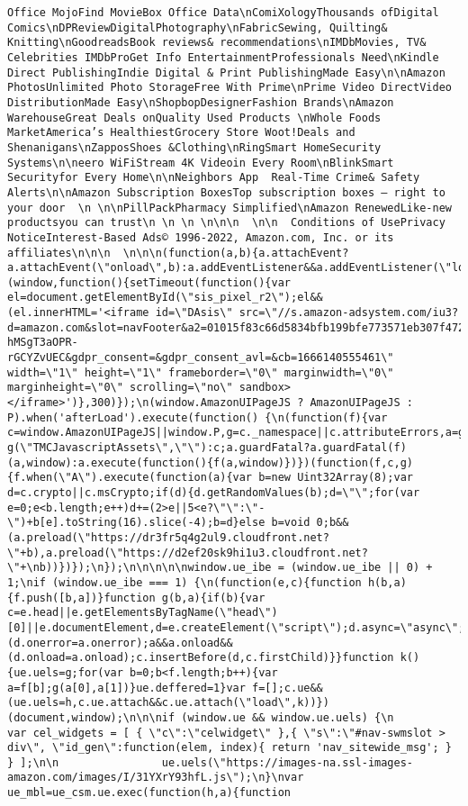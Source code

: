 \documentclass[
]{article}
\begin{document}
\begin{verbatim}
Office MojoFind MovieBox Office Data\nComiXologyThousands ofDigital Comics\nDPReviewDigitalPhotography\nFabricSewing, Quilting& Knitting\nGoodreadsBook reviews& recommendations\nIMDbMovies, TV& Celebrities IMDbProGet Info EntertainmentProfessionals Need\nKindle Direct PublishingIndie Digital & Print PublishingMade Easy\n\nAmazon PhotosUnlimited Photo StorageFree With Prime\nPrime Video DirectVideo DistributionMade Easy\nShopbopDesignerFashion Brands\nAmazon WarehouseGreat Deals onQuality Used Products \nWhole Foods MarketAmerica’s HealthiestGrocery Store Woot!Deals and Shenanigans\nZapposShoes &Clothing\nRingSmart HomeSecurity Systems\n\neero WiFiStream 4K Videoin Every Room\nBlinkSmart Securityfor Every Home\n\nNeighbors App  Real-Time Crime& Safety Alerts\n\nAmazon Subscription BoxesTop subscription boxes – right to your door  \n \n\nPillPackPharmacy Simplified\nAmazon RenewedLike-new productsyou can trust\n \n \n \n\n\n  \n\n  Conditions of UsePrivacy NoticeInterest-Based Ads© 1996-2022, Amazon.com, Inc. or its affiliates\n\n\n  \n\n\n(function(a,b){a.attachEvent?a.attachEvent(\"onload\",b):a.addEventListener&&a.addEventListener(\"load\",b,!1)})(window,function(){setTimeout(function(){var el=document.getElementById(\"sis_pixel_r2\");el&&(el.innerHTML='<iframe id=\"DAsis\" src=\"//s.amazon-adsystem.com/iu3?d=amazon.com&slot=navFooter&a2=01015f83c66d5834bfb199bfe773571eb307f47201e25af2e5a6c51e7460d476ba09&old_oo=0&ts=1666140555461&s=AabdAbdHLq_vxJUqwIAcT_D-hMSgT3aOPR-rGCYZvUEC&gdpr_consent=&gdpr_consent_avl=&cb=1666140555461\" width=\"1\" height=\"1\" frameborder=\"0\" marginwidth=\"0\" marginheight=\"0\" scrolling=\"no\" sandbox></iframe>')},300)});\n(window.AmazonUIPageJS ? AmazonUIPageJS : P).when('afterLoad').execute(function() {\n(function(f){var c=window.AmazonUIPageJS||window.P,g=c._namespace||c.attributeErrors,a=g?g(\"TMCJavascriptAssets\",\"\"):c;a.guardFatal?a.guardFatal(f)(a,window):a.execute(function(){f(a,window)})})(function(f,c,g){f.when(\"A\").execute(function(a){var b=new Uint32Array(8);var d=c.crypto||c.msCrypto;if(d){d.getRandomValues(b);d=\"\";for(var e=0;e<b.length;e++)d+=(2>e||5<e?\"\":\"-\")+b[e].toString(16).slice(-4);b=d}else b=void 0;b&&(a.preload(\"https://dr3fr5q4g2ul9.cloudfront.net?\"+b),a.preload(\"https://d2ef20sk9hi1u3.cloudfront.net?\"+\nb))})});\n});\n\n\n\n\nwindow.ue_ibe = (window.ue_ibe || 0) + 1;\nif (window.ue_ibe === 1) {\n(function(e,c){function h(b,a){f.push([b,a])}function g(b,a){if(b){var c=e.head||e.getElementsByTagName(\"head\")[0]||e.documentElement,d=e.createElement(\"script\");d.async=\"async\";d.src=b;d.setAttribute(\"crossorigin\",\"anonymous\");a&&a.onerror&&(d.onerror=a.onerror);a&&a.onload&&(d.onload=a.onload);c.insertBefore(d,c.firstChild)}}function k(){ue.uels=g;for(var b=0;b<f.length;b++){var a=f[b];g(a[0],a[1])}ue.deffered=1}var f=[];c.ue&&(ue.uels=h,c.ue.attach&&c.ue.attach(\"load\",k))})(document,window);\n\n\nif (window.ue && window.ue.uels) {\n        var cel_widgets = [ { \"c\":\"celwidget\" },{ \"s\":\"#nav-swmslot > div\", \"id_gen\":function(elem, index){ return 'nav_sitewide_msg'; } } ];\n\n                ue.uels(\"https://images-na.ssl-images-amazon.com/images/I/31YXrY93hfL.js\");\n}\nvar ue_mbl=ue_csm.ue.exec(function(h,a){function 
\end{verbatim}
\end{document}
